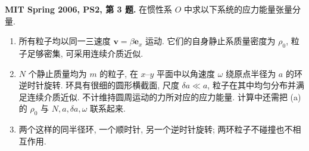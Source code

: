 \begin{exercise}
\textbf{MIT Spring 2006, PS2, 第 3 题.} 在惯性系 $O$ 中求以下系统的应力能量张量分量.
\begin{enumerate}[label=(\alph*)]
\item 所有粒子均以同一三速度 $\boldsymbol v=\beta\boldsymbol e_x$ 运动. 它们的自身静止系质量密度为 $\rho_0$, 粒子足够密集, 可采用连续介质近似.
\item $N$ 个静止质量均为 $m$ 的粒子, 在 $x$--$y$ 平面中以角速度 $\omega$ 绕原点半径为 $a$ 的环逆时针旋转. 环具有很细的圆形横截面, 尺度 $\delta a\ll a$, 粒子在其中均匀分布并满足连续介质近似. 不计维持圆周运动的力所对应的应力能量. 计算中还需把 (a) 的 $\rho_0$ 与 $N,a,\delta a,\omega$ 联系起来.
\item 两个这样的同半径环, 一个顺时针, 另一个逆时针旋转; 两环粒子不碰撞也不相互作用.
\end{enumerate}
\end{exercise}
